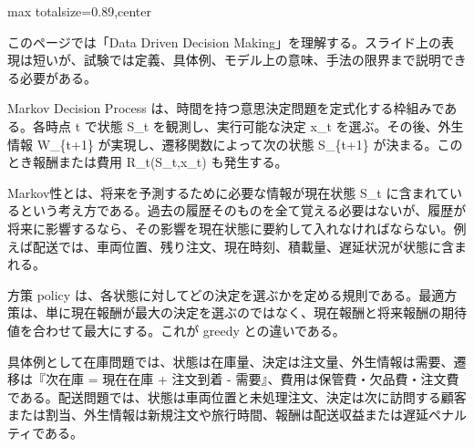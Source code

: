 \begin{minipage}[t]{0.58\textwidth}
\begin{adjustbox}{max totalsize={\textwidth}{0.89\textheight},center}
\begin{minipage}{\textwidth}\scriptsize
{}このページでは「Data Driven Decision Making」を理解する。スライド上の表現は短いが、試験では定義、具体例、モデル上の意味、手法の限界まで説明できる必要がある。\par
Markov Decision Process は、時間を持つ意思決定問題を定式化する枠組みである。各時点 t で状態 S\_t を観測し、実行可能な決定 x\_t を選ぶ。その後、外生情報 W\_\{t+1\} が実現し、遷移関数によって次の状態 S\_\{t+1\} が決まる。このとき報酬または費用 R\_t(S\_t,x\_t) も発生する。\par
Markov性とは、将来を予測するために必要な情報が現在状態 S\_t に含まれているという考え方である。過去の履歴そのものを全て覚える必要はないが、履歴が将来に影響するなら、その影響を現在状態に要約して入れなければならない。例えば配送では、車両位置、残り注文、現在時刻、積載量、遅延状況が状態に含まれる。\par
方策 policy は、各状態に対してどの決定を選ぶかを定める規則である。最適方策は、単に現在報酬が最大の決定を選ぶのではなく、現在報酬と将来報酬の期待値を合わせて最大にする。これが greedy との違いである。\par
具体例として在庫問題では、状態は在庫量、決定は注文量、外生情報は需要、遷移は『次在庫 = 現在在庫 + 注文到着 - 需要』、費用は保管費・欠品費・注文費である。配送問題では、状態は車両位置と未処理注文、決定は次に訪問する顧客または割当、外生情報は新規注文や旅行時間、報酬は配送収益または遅延ペナルティである。\par

\end{minipage}
\end{adjustbox}
\end{minipage}
